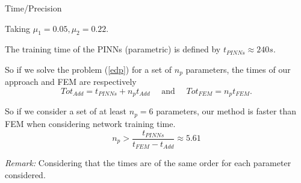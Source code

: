 \begin{frame}{Time/Precision}	
	\begin{minipage}{0.48\linewidth}
		\centering
		\vspace{-10pt}
	\end{minipage}
	\begin{minipage}{0.48\linewidth}
		Taking $\mu_1=0.05,\mu_2=0.22$.
		
		\centering
	\end{minipage}

%

	The training time of the PINNs (parametric) is defined by $t_{PINNs}\approx 240s$. 
	
	So if we solve the problem (\ref{edp}) for a set of $n_p$ parameters, the times of our approach and FEM are respectively
	\begin{equation*}
		Tot_{Add}=t_{PINNs}+n_p t_{Add} \quad \text{ and } \quad Tot_{FEM}=n_p t_{FEM}.
	\end{equation*}
	
	So if we consider a set of at least $n_p=6$ parameters, our method is faster than FEM when considering network training time.
	\begin{equation*}
		n_p > \frac{t_{PINNs}}{t_{FEM}-t_{Add}}\approx 5.61
	\end{equation*}

	\footnotesize
	\textit{Remark:} Considering that the times are of the same order for each parameter considered.	
\end{frame}

